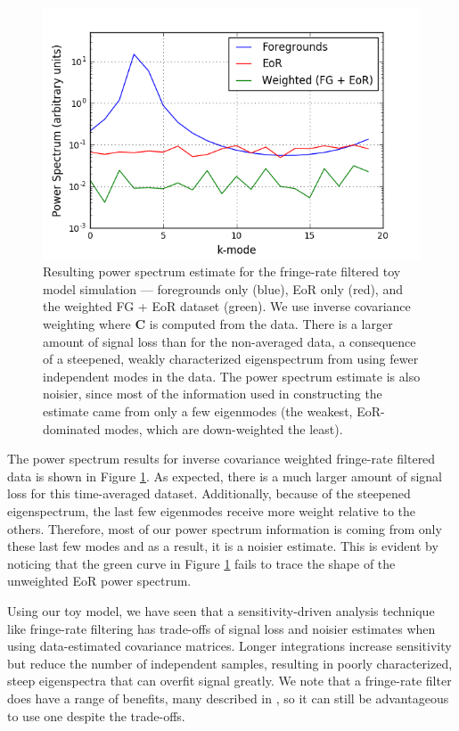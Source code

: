 \documentclass[preprint2,numberedappendix,tighten]{aastex6}  %
\begin{document}
\begin{figure}
	\centering
	\includegraphics[trim={0.3cm 0.2cm 0.3cm 0.3cm},clip,width=\columnwidth]{plots/toy_sigloss7.png}
	\caption{Resulting power spectrum estimate for the fringe-rate filtered toy model simulation --- foregrounds only (blue), 
EoR only (red), and the weighted FG + EoR dataset (green). We use inverse covariance weighting where $\textbf{C}$ is 
computed from the data. There is a larger amount of signal loss than for the non-averaged data, a consequence of a 
steepened, weakly characterized eigenspectrum from using fewer independent modes in the data. The power spectrum 
estimate is also noisier, since most of the information used in constructing the estimate came from only a few eigenmodes (the 
weakest, EoR-dominated modes, which are down-weighted the least).}
	\label{fig:toy_sigloss7}
\end{figure}

The power spectrum results for inverse covariance weighted fringe-rate filtered data is shown in Figure \ref{fig:toy_sigloss7}. As 
expected, there is a much larger amount of signal loss for this time-averaged dataset. Additionally, because of the steepened 
eigenspectrum, the last few eigenmodes receive more weight relative to the others. Therefore, most of our power spectrum 
information is coming from only these last few modes and as a result, it is a noisier estimate. This is evident by noticing that the 
green curve in Figure \ref{fig:toy_sigloss7} fails to trace the shape of the unweighted EoR power spectrum.

Using our toy model, we have seen that a sensitivity-driven analysis technique like fringe-rate filtering has trade-offs of signal 
loss and noisier estimates when using data-estimated covariance matrices. Longer integrations increase sensitivity but reduce 
the number of independent samples, resulting in poorly characterized, steep eigenspectra that can overfit signal greatly. We 
note that a fringe-rate filter does have a range of benefits, many described in \citet{parsons_et_al2016}, so it can still be 
advantageous to use one despite the trade-offs.
\end{document}
